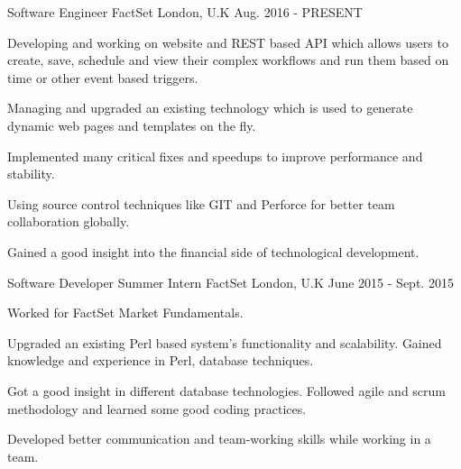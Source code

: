 

\begin{cventries}

  \cventry
    {Software Engineer} %
    {FactSet} %
    {London, U.K} %
    {Aug. 2016 - PRESENT} %
    {
      \begin{cvitems} %
        \item {Developing and working on website and REST based API which allows users to create, save, schedule and view their complex workflows and run them based on time or other event based triggers.}
        \item {Managing and upgraded an existing technology which is used to generate dynamic web pages and templates on the fly.}
        \item {Implemented many critical fixes and speedups to improve performance and stability.}
		\item {Using source control techniques like GIT and Perforce for better team collaboration globally.}
        \item {Gained a good insight into the financial side of technological development.}
      \end{cvitems}
    }

  \cventry
    {Software Developer Summer Intern} %
    {FactSet} %
    {London, U.K} %
    {June 2015 - Sept. 2015} %
    {
      \begin{cvitems} %
        \item {Worked for FactSet Market Fundamentals.}
        \item {Upgraded an existing Perl based system’s functionality and scalability. Gained knowledge and experience in Perl, database techniques.}
        \item {Got a good insight in different database technologies. Followed agile and scrum methodology and learned some good coding practices.}
        \item {Developed better communication and team-working skills while working in a team.}
      \end{cvitems}
    }


\end{cventries}
